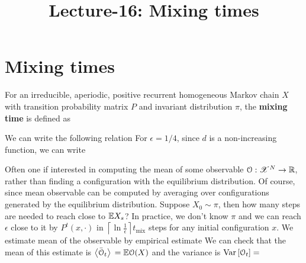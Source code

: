 \documentclass[letterpaper,english,10pt]{article}
\title{Lecture-16: Mixing times}
\begin{document}
\maketitle

\section{Mixing times}
\begin{defn}
For an irreducible, aperiodic, positive recurrent homogeneous Markov chain $X$ with transition probability matrix $P$ and invariant distribution $\pi$, 
the \textbf{mixing time} is defined as 
\end{defn}
We can write the following relation 
For $\epsilon = 1/4$, since $d$ is a non-increasing function, %
we can write 

Often one if interested in computing the mean of some observable $\mathcal{O}: \mathscr{X}^N \to \mathbb{R}$, 
rather than finding a configuration with the equilibrium distribution. 
Of course, since 
mean observable can be computed by averaging over configurations generated by the equilibrium distribution. 
Suppose $X_0 \sim \pi$, then how many steps are needed to reach close to $\mathbb{E} X_s$? 
In practice, we don't know $\pi$ and we can reach $\epsilon$ close to it by $P^t(x,\cdot)$ in $\left\lceil\ln \frac{1}{\epsilon}\right\rceil t_{\text{mix}}$ steps for any initial configuration $x$.  
We estimate mean of the observable by empirical estimate 
We can check that the mean of this estimate is $\left\langle\bar{\mathcal{O}}_t\right\rangle{} = \mathbb{E}\mathcal{O}(X)$ and the variance is $\operatorname{Var}\left[\mathcal{O}_t\right] = $
\end{document}

